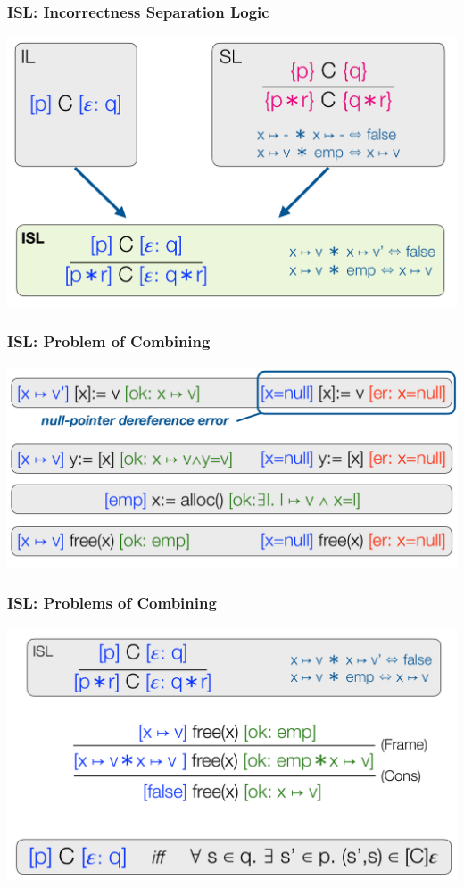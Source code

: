 \documentclass[11pt]{beamer}
\begin{document}
\begin{frame}\frametitle{ISL: Incorrectness Separation Logic}
\begin{center}
\includegraphics[scale=0.2]{isl.png}
\end{center}


\end{frame}


\begin{frame}\frametitle{ISL: Problem of Combining}

\begin{center}
\includegraphics[scale=0.2]{firsttry.png}
\end{center}



\end{frame}

\begin{frame}\frametitle{ISL: Problems of Combining}

\begin{center}
\includegraphics[scale=0.2]{kaboom.png}
\end{center}

\end{frame}
\end{document}
